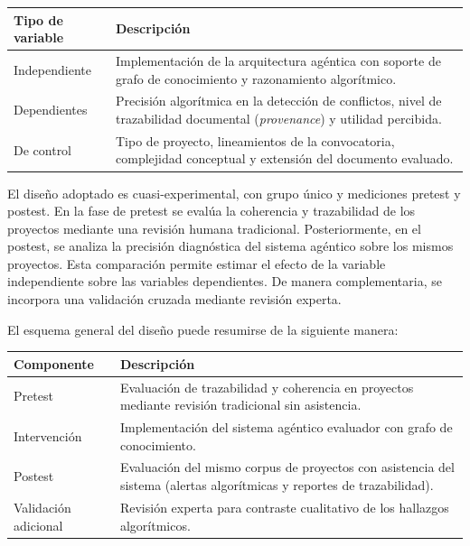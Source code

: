 \documentclass[12pt,letterpaper]{article}
\begin{document}
\begin{table}[H]
\centering
\begin{tabular}{|p{4cm}|p{9cm}|}
\hline
\textbf{Tipo de variable} & \textbf{Descripción} \\ \hline
Independiente & Implementación de la arquitectura agéntica con soporte de grafo de conocimiento y razonamiento algorítmico. \\ \hline
Dependientes & Precisión algorítmica en la detección de conflictos, nivel de trazabilidad documental (\textit{provenance}) y utilidad percibida. \\ \hline
De control & Tipo de proyecto, lineamientos de la convocatoria, complejidad conceptual y extensión del documento evaluado. \\ \hline
\end{tabular}
\end{table}

El diseño adoptado es cuasi-experimental, con grupo único y mediciones pretest y postest. En la fase de pretest se evalúa la coherencia y trazabilidad de los proyectos mediante una revisión humana tradicional. Posteriormente, en el postest, se analiza la precisión diagnóstica del sistema agéntico sobre los mismos proyectos. Esta comparación permite estimar el efecto de la variable independiente sobre las variables dependientes. De manera complementaria, se incorpora una validación cruzada mediante revisión experta.

El esquema general del diseño puede resumirse de la siguiente manera:

\begin{table}[H]
\centering
\begin{tabular}{|p{4cm}|p{9cm}|}
\hline
\textbf{Componente} &\textbf{ Descripción} \\ \hline
Pretest & Evaluación de trazabilidad y coherencia en proyectos mediante revisión tradicional sin asistencia. \\ \hline
Intervención & Implementación del sistema agéntico evaluador con grafo de conocimiento. \\ \hline
Postest & Evaluación del mismo corpus de proyectos con asistencia del sistema (alertas algorítmicas y reportes de trazabilidad). \\ \hline
Validación adicional & Revisión experta para contraste cualitativo de los hallazgos algorítmicos. \\ \hline
\end{tabular}
\end{table}
\end{document}
